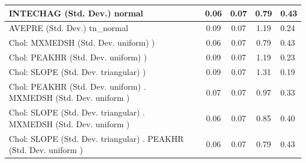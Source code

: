 \begin{table}
\begin{center}
\begin{tabular}{|l|l|c|c|c|l|}
			\hline
			INTECHAG (Std. Dev.) normal &  & 0.06 & 0.07 & 0.79 & 0.43 \\
			\hline
			AVEPRE (Std. Dev.) tn_normal &  & 0.09 & 0.07 & 1.19 & 0.24 \\
			\hline
			 Chol: MXMEDSH (Std. Dev. uniform) ) &  & 0.06 & 0.07 & 0.79 & 0.43 \\
			\hline
			 Chol: PEAKHR (Std. Dev. uniform) ) &  & 0.09 & 0.07 & 1.19 & 0.23 \\
			\hline
			 Chol: SLOPE (Std. Dev. triangular) ) &  & 0.09 & 0.07 & 1.31 & 0.19 \\
			\hline
			 Chol: PEAKHR (Std. Dev. uniform) . MXMEDSH (Std. Dev.   uniform ) &  & 0.07 & 0.07 & 0.97 & 0.33 \\
			\hline
			 Chol: SLOPE (Std. Dev. triangular) . MXMEDSH (Std. Dev.   uniform ) &  & 0.06 & 0.07 & 0.85 & 0.40 \\
			\hline
			 Chol: SLOPE (Std. Dev. triangular) . PEAKHR (Std. Dev.   uniform ) &  & 0.06 & 0.07 & 0.79 & 0.43 \\
			\hline
		\end{tabular}
	\end{center}
\end{table}
